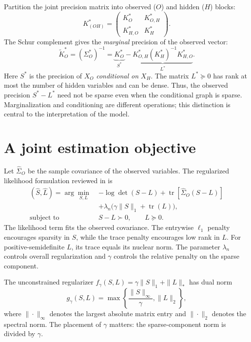 \documentclass[11pt]{article}
\newcommand{\tr}{\operatorname{tr}}
\begin{document}
Partition the joint precision matrix into observed ($O$) and hidden ($H$) blocks:
\[
K^*_{(OH)}=\begin{pmatrix}K_O^*&K_{O,H}^*\\K_{H,O}^*&K_H^*\end{pmatrix}.
\]
The Schur complement gives the \emph{marginal} precision of the observed vector:
\begin{equation}
\widetilde K_O^*=(\Sigma_O^*)^{-1}
=\underbrace{K_O^*}_{S^*}
-\underbrace{K_{O,H}^*(K_H^*)^{-1}K_{H,O}^*}_{L^*}.
\end{equation}
Here $S^*$ is the precision of $X_O$ \emph{conditional on} $X_H$. The matrix
$L^*\succeq0$ has rank at most the number of hidden variables and can be dense.
Thus, the observed precision $S^*-L^*$ need not be sparse even when the
conditional graph is sparse. Marginalization and conditioning are different
operations; this distinction is central to the interpretation of the model.

\newpage
\section{A joint estimation objective}
Let $\widehat\Sigma_O$ be the sample covariance of the observed variables.
The regularized likelihood formulation reviewed in \cite{cpw} is
\begin{equation}
\begin{aligned}
(\widehat S,\widehat L)=\arg\min_{S,L}\;&
-\log\det(S-L)+\tr\!\left[\widehat\Sigma_O(S-L)\right]\\
&+\lambda_n\bigl(\gamma\|S\|_1+\tr(L)\bigr),\\
\text{subject to }&S-L\succ0,\qquad L\succeq0.
\end{aligned}
\end{equation}
The likelihood term fits the observed covariance. The entrywise $\ell_1$ penalty
encourages sparsity in $S$, while the trace penalty encourages low rank in $L$.
For positive-semidefinite $L$, its trace equals its nuclear norm. The parameter
$\lambda_n$ controls overall regularization and $\gamma$ controls the relative
penalty on the sparse component.

The unconstrained regularizer
$f_\gamma(S,L)=\gamma\|S\|_1+\|L\|_*$ has dual norm
\begin{equation}
g_\gamma(S,L)=\max\left\{\frac{\|S\|_\infty}{\gamma},\|L\|_2\right\},
\end{equation}
where $\|\cdot\|_\infty$ denotes the largest absolute matrix entry and
$\|\cdot\|_2$ denotes the spectral norm. The placement of $\gamma$ matters:
the sparse-component norm is divided by $\gamma$.
\end{document}
